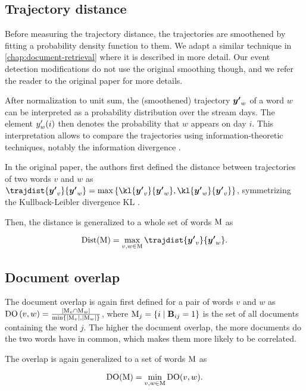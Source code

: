 \subsection{Trajectory distance}
Before measuring the trajectory distance, the trajectories are smoothened by fitting a probability density function to them. We adapt a similar technique in \autoref{chap:document-retrieval} where it is described in more detail. Our event detection modifications do not use the original smoothing though, and we refer the reader to the original paper for more details.

After normalization to unit sum, the (smoothened) trajectory $\vect{\trajn}_{w}$ of a word $w$ can be interpreted as a probability distribution over the stream days. The element $y'_{w}(i)$ then denotes the probability that $w$ appears on day $i$. This interpretation allows to compare the trajectories using information-theoretic techniques, notably the information divergence \citep{information-theory}.

In the original paper, the authors first defined the distance between trajectories of two words $v$ and $w$ as $\trajdist{\vect{\trajn}_{v}}{\vect{\trajn}_{w}} = \max \left\{ \kl{\vect{\trajn}_{v}}{\vect{\trajn}_{w}}, \kl{\vect{\trajn}_{w}}{\vect{\trajn}_{v}} \right\}$, symmetrizing the Kullback-Leibler divergence KL \citep{kl-divergence}.

Then, the distance is generalized to a whole set of words $\text{M}$ as

\begin{equation}
	\text{Dist}( \featset ) = \max_{v, w \in \featset} \trajdist{\vect{\trajn}_{v}}{\vect{\trajn}_{w}}.
\end{equation}

\subsection{Document overlap}
The document overlap is again first defined for a pair of words $v$ and $w$ as $\text{DO}\left( v, w \right) = \frac{| \text{M}_{v} \cap \text{M}_{w} |}{\min \left\{ | \text{M}_{v} |, | \text{M}_{w} | \right\}}$, where $\text{M}_{j} = \{ i \mid \mathbf{B}_{ij} = 1 \}$ is the set of all documents containing the word $j$. The higher the document overlap, the more documents do the two words have in common, which makes them more likely to be correlated.

The overlap is again generalized to a set of words $\text{M}$ as

\begin{equation}
	\text{DO}( \text{M} ) = \min_{v, w \in \text{M}} \text{DO}( v, w ).
\end{equation}

